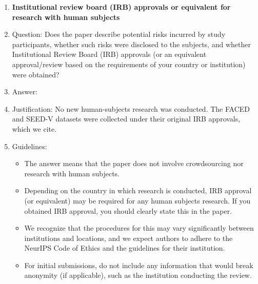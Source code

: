 \begin{enumerate}
\item {\bf Institutional review board (IRB) approvals or equivalent for research with human subjects}
    \item[] Question: Does the paper describe potential risks incurred by study participants, whether such risks were disclosed to the subjects, and whether Institutional Review Board (IRB) approvals (or an equivalent approval/review based on the requirements of your country or institution) were obtained?
    \item[] Answer: \answerNA{}
    \item[] Justification: No new human-subjects research was conducted. The FACED \citep{chen2023faced} and SEED-V \citep{liu2022seedv} datasets were collected under their original IRB approvals, which we cite.
    \item[] Guidelines:
    \begin{itemize}
        \item The answer \answerNA{} means that the paper does not involve crowdsourcing nor research with human subjects.
        \item Depending on the country in which research is conducted, IRB approval (or equivalent) may be required for any human subjects research. If you obtained IRB approval, you should clearly state this in the paper.
        \item We recognize that the procedures for this may vary significantly between institutions and locations, and we expect authors to adhere to the NeurIPS Code of Ethics and the guidelines for their institution.
        \item For initial submissions, do not include any information that would break anonymity (if applicable), such as the institution conducting the review.
    \end{itemize}


\end{enumerate}
